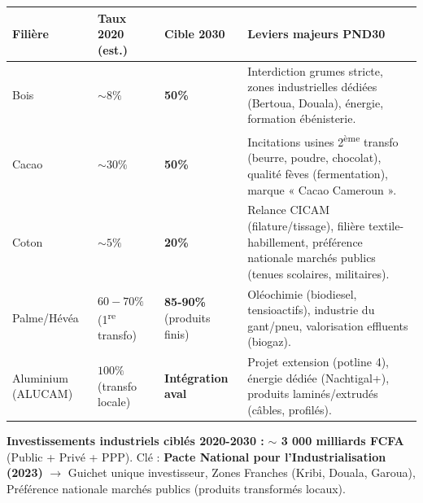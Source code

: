 \documentclass[11pt]{article}
\begin{document}
\begin{exemplebox}
\begin{center}
\begin{tabularx}{\linewidth}{|l|X|X|X|}\hline
\textbf{Filière} & \textbf{Taux 2020 (est.)} & \textbf{Cible 2030} & \textbf{Leviers majeurs PND30} \\ \hline
Bois & $\sim 8\%$ & \textbf{50\%} & Interdiction grumes stricte, zones industrielles dédiées (Bertoua, Douala), énergie, formation ébénisterie. \\ \hline
Cacao & $\sim 30\%$ & \textbf{50\%} & Incitations usines 2\textsuperscript{ème} transfo (beurre, poudre, chocolat), qualité fèves (fermentation), marque « Cacao Cameroun ». \\ \hline
Coton & $\sim 5\%$ & \textbf{20\%} & Relance CICAM (filature/tissage), filière textile-habillement, préférence nationale marchés publics (tenues scolaires, militaires). \\ \hline
Palme/Hévéa & $60-70\%$ (1\textsuperscript{re} transfo) & \textbf{85-90\%} (produits finis) & Oléochimie (biodiesel, tensioactifs), industrie du gant/pneu, valorisation effluents (biogaz). \\ \hline
Aluminium (ALUCAM) & $100\%$ (transfo locale) & \textbf{Intégration aval} & Projet extension (potline 4), énergie dédiée (Nachtigal+), produits laminés/extrudés (câbles, profilés). \\ \hline
\end{tabularx}
\end{center}
\textbf{Investissements industriels ciblés 2020-2030 :} \textbf{$\sim$ 3 000 milliards FCFA} (Public + Privé + PPP). Clé : \textbf{Pacte National pour l'Industrialisation (2023)} $\to$ Guichet unique investisseur, Zones Franches (Kribi, Douala, Garoua), Préférence nationale marchés publics (produits transformés locaux).
\end{exemplebox}
\end{document}
